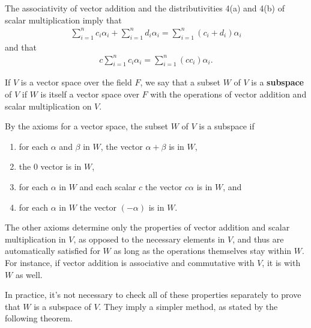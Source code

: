 \documentclass[12pt]{article}
\begin{document}
\begin{comm}
  The associativity of vector addition and the distributivities
  4(a) and 4(b) of scalar multiplication imply that
  \begin{align*}
    \sum_{i = 1}^{n}c_i\alpha_i + \sum_{i = 1}^{n}d_i\alpha_i =
    \sum_{i = 1}^{n}(c_i + d_i)\alpha_i
  \end{align*}
  and that
  \begin{align*}
    c\sum_{i = 1}^{n}c_i\alpha_i = \sum_{i =
    1}^{n}(cc_i)\alpha_i.
  \end{align*}
\end{comm}

\begin{defn}
  If $V$ is a vector space over the field $F$, we say that a subset $W$ of $V$ is a
  \textbf{subspace} of $V$ if $W$ is itself a vector space over $F$ with the
  operations of vector addition and scalar multiplication on $V$.
\end{defn}

\begin{comm}
  By the axioms for a vector space, the subset $W$ of $V$ is a subspace if
  \begin{enumerate}
    \item
      for each $\alpha$ and $\beta$ in $W$, the vector $\alpha + \beta$ is in $W$,
    \item
      the $0$ vector is in $W$,
    \item
      for each $\alpha$ in $W$ and each scalar $c$ the vector $c\alpha$ is in $W$,
      and
    \item
      for each $\alpha$ in $W$ the vector $(-\alpha)$ is in $W$.
  \end{enumerate}
  The other axioms determine only the properties of vector addition and scalar
  multiplication in $V$, as opposed to the necessary elements in $V$, and thus are
  automatically satisfied for $W$ as long as the operations themselves stay within
  $W$. For instance, if vector addition is associative and commutative with $V$, it
  is with $W$ as well.

  In practice, it's not necessary to check all of these properties separately to
  prove that $W$ is a subspace of $V$. They imply a simpler method, as stated by the
  following theorem.
\end{comm}
\end{document}
